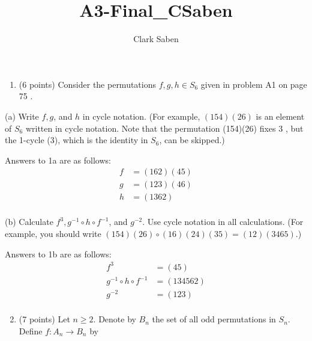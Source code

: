 \documentclass[12pt]{article}
\newenvironment{problem}[2][Problem]{\begin{trivlist}
\item[\hskip \labelsep {\bfseries #1}\hskip \labelsep {\bfseries #2.}]}{\end{trivlist}}
\begin{document}
 
 
\title{A3-Final\_CSaben}
\author{Clark Saben}

 
\maketitle
\begin{enumerate}
  \item (6 points) Consider the permutations $f, g, h \in S_{6}$ given in problem A1 on page 75 .
\end{enumerate}

(a) Write $f, g$, and $h$ in cycle notation.
(For example, $(154)(26)$ is an element of $S_{6}$ written in cycle notation. Note that the permutation (154)(26) fixes 3 , but the 1-cycle (3), which is the identity in $S_{6}$, can be skipped.)
\begin{problem}{1a} 
	Answers to 1a are as follows: 
	\center
	$$
	\begin{aligned}
		f &= (162)(45) \\
		g &= (123)(46) \\
		h &= (1362) \\
	\end{aligned}
	$$
\end{problem}



(b) Calculate $f^{3}, g^{-1} \circ h \circ f^{-1}$, and $g^{-2}$. Use cycle notation in all calculations. (For example, you should write $(154)(26) \circ(16)(24)(35)=(12)(3465)$.)
\begin{problem}{1b} 
	Answers to 1b are as follows:
	\center
	$$
	\begin{aligned}
		f^3 &= (45) \\
		g^{-1} \circ h \circ f^{-1} &= (134562) \\
		g^{-2} &= (123) \\
	\end{aligned}
	$$
\end{problem}

\begin{enumerate}
  \setcounter{enumi}{1}
  \item (7 points) Let $n \geq 2$. Denote by $B_{n}$ the set of all odd permutations in $S_{n}$. Define $f: A_{n} \rightarrow B_{n}$ by
\end{enumerate}
\end{document}
